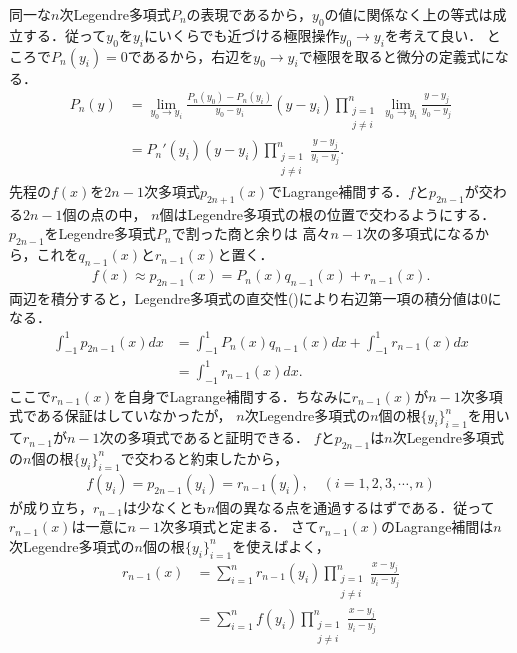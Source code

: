 \documentclass[a4j,papersize,disablejfam,slide,14pt]{jsarticle}
\begin{document}
    同一な$n$次{\rm Legendre}多項式$P_n$の表現であるから，$y_0$の値に関係なく上の等式は成立する．従って$y_0$を$y_i$にいくらでも近づける極限操作$y_0 \to y_i$を考えて良い．
    ところで$P_n(y_i) = 0$であるから，右辺を$y_0 \to y_i$で極限を取ると微分の定義式になる．
    \begin{align}
    	P_n(y) &= \lim_{y_0 \to y_i} \frac{P_n(y_0) - P_n(y_i)}{y_0 - y_i} (y - y_i) \prod_{\substack{j=1 \\ j \neq i}}^{n} \lim_{y_0 \to y_i} \frac{y-y_j}{y_0 - y_j} \\
        &= P_n'(y_i) (y - y_i) \prod_{\substack{j=1 \\ j \neq i}}^{n} \frac{y-y_j}{y_i - y_j}. \label{eq:legendre_limit}
    \end{align}
    先程の$f(x)$を$2n - 1$次多項式$p_{2n+1}(x)$で{\rm Lagrange}補間する．$f$と$p_{2n-1}$が交わる$2n-1$個の点の中，
    $n$個は{\rm Legendre}多項式の根の位置で交わるようにする．$p_{2n - 1}$を{\rm Legendre}多項式$P_n$で割った商と余りは
    高々$n-1$次の多項式になるから，これを$q_{n-1}(x)$と$r_{n-1}(x)$と置く．
    \begin{align}
    	f(x) \approx p_{2n-1}(x) = P_n(x) q_{n-1}(x) + r_{n-1}(x).
    \end{align}
    両辺を積分すると，{\rm Legendre}多項式の直交性()により右辺第一項の積分値は$0$になる．
    \begin{align}
    	\int_{-1}^{1} p_{2n-1}(x) dx &= \int_{-1}^{1} P_n(x) q_{n-1}(x) dx + \int_{-1}^{1} r_{n-1}(x) dx \\
        &= \int_{-1}^{1} r_{n-1}(x) dx.
    \end{align}
    ここで$r_{n-1}(x)$を自身で{\rm Lagrange}補間する．ちなみに$r_{n-1}(x)$が$n-1$次多項式である保証はしていなかったが，
    $n$次{\rm Legendre}多項式の$n$個の根$\{y_i\}_{i=1}^{n}$を用いて$r_{n-1}$が$n-1$次の多項式であると証明できる．
    $f$と$p_{2n-1}$は$n$次{\rm Legendre}多項式の$n$個の根$\{y_i\}_{i=1}^{n}$で交わると約束したから，
    \begin{align}
    	f(y_i) = p_{2n-1} (y_i) = r_{n-1} (y_i), \quad (i = 1,2,3,\cdots,n)
    \end{align}
    が成り立ち，$r_{n-1}$は少なくとも$n$個の異なる点を通過するはずである．従って$r_{n-1}(x)$は一意に$n-1$次多項式と定まる．
    さて$r_{n-1}(x)$の{\rm Lagrange}補間は$n$次{\rm Legendre}多項式の$n$個の根$\{y_i\}_{i=1}^{n}$を使えばよく，
    \begin{align}
    	r_{n-1} (x) &= \sum_{i=1}^{n} r_{n-1}(y_i) \prod_{\substack{j=1 \\ j \neq i}}^{n} \frac{x-y_j}{y_i - y_j} \\
        &= \sum_{i=1}^{n} f(y_i) \prod_{\substack{j=1 \\ j \neq i}}^{n} \frac{x-y_j}{y_i - y_j} \\
    \end{align}
\end{document}
